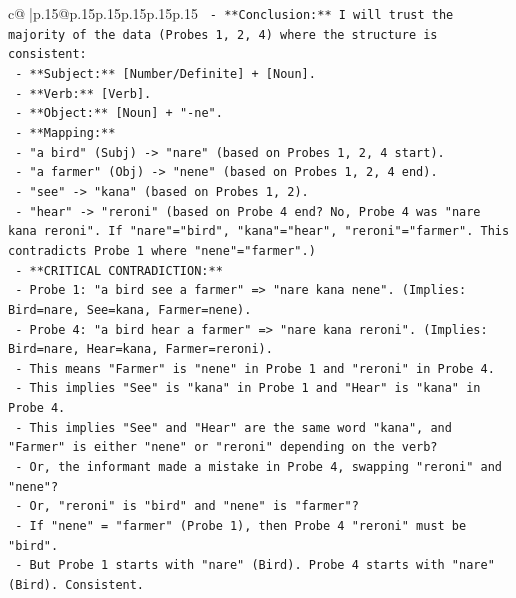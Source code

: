 \documentclass{article}
\begin{document}
{\begin{supertabular}{c@{$\;$}|p{.15\linewidth}@{}p{.15\linewidth}p{.15\linewidth}p{.15\linewidth}p{.15\linewidth}p{.15\linewidth}}
{{{\texttt{        {-} **Conclusion:** I will trust the majority of the data (Probes 1, 2, 4) where the structure is consistent:} \\
\texttt{          {-} **Subject:** {[}Number/Definite{]} + {[}Noun{]}.} \\
\texttt{          {-} **Verb:** {[}Verb{]}.} \\
\texttt{          {-} **Object:** {[}Noun{]} + "{-}ne".} \\
\texttt{          {-} **Mapping:**} \\
\texttt{            {-} "a bird" (Subj) {-}> "nare" (based on Probes 1, 2, 4 start).} \\
\texttt{            {-} "a farmer" (Obj) {-}> "nene" (based on Probes 1, 2, 4 end).} \\
\texttt{            {-} "see" {-}> "kana" (based on Probes 1, 2).} \\
\texttt{            {-} "hear" {-}> "reroni" (based on Probe 4 end? No, Probe 4 was "nare kana reroni". If "nare"="bird", "kana"="hear", "reroni"="farmer". This contradicts Probe 1 where "nene"="farmer".)} \\
\texttt{            {-} **CRITICAL CONTRADICTION:**} \\
\texttt{              {-} Probe 1: "a bird see a farmer" => "nare kana nene". (Implies: Bird=nare, See=kana, Farmer=nene).} \\
\texttt{              {-} Probe 4: "a bird hear a farmer" => "nare kana reroni". (Implies: Bird=nare, Hear=kana, Farmer=reroni).} \\
\texttt{              {-} This means "Farmer" is "nene" in Probe 1 and "reroni" in Probe 4.} \\
\texttt{              {-} This implies "See" is "kana" in Probe 1 and "Hear" is "kana" in Probe 4.} \\
\texttt{              {-} This implies "See" and "Hear" are the same word "kana", and "Farmer" is either "nene" or "reroni" depending on the verb?} \\
\texttt{              {-} Or, the informant made a mistake in Probe 4, swapping "reroni" and "nene"?} \\
\texttt{              {-} Or, "reroni" is "bird" and "nene" is "farmer"?} \\
\texttt{                {-} If "nene" = "farmer" (Probe 1), then Probe 4 "reroni" must be "bird".} \\
\texttt{                {-} But Probe 1 starts with "nare" (Bird). Probe 4 starts with "nare" (Bird). Consistent.} \\
}}}
\end{supertabular}}
\end{document}
